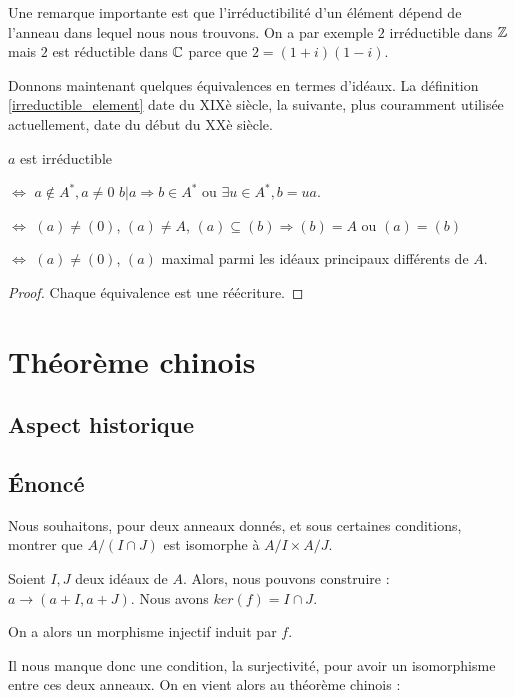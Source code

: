 Une remarque importante est que l'irréductibilité d'un élément dépend de l'anneau
dans lequel nous nous trouvons. On a par exemple $2$ irréductible dans
$\mathbb{Z}$ mais $2$ est réductible dans $\mathbb{C}$ parce que $2 = (1 + i) (1 -
i)$.

Donnons maintenant quelques équivalences en termes d'idéaux. La définition
\ref{irreductible_element} date du XIXè siècle, la suivante, plus couramment
utilisée actuellement, date du début du XXè siècle.

\begin{proposition}

	$a$ est irréductible

	$\Leftrightarrow$
	$a \notin A^{*}, a \ne 0$ $b | a \Rightarrow b \in A^{*}$ ou $\exists u \in
	A^{*}, b = ua$.

	$\Leftrightarrow$
	$(a) \ne (0)$, $(a) \ne A$, $(a) \subseteq (b) \Rightarrow (b) = A$ ou $(a)
	= (b)$

	$\Leftrightarrow$
	$(a) \ne (0)$, $(a)$ maximal parmi les idéaux principaux différents de $A$.
\end{proposition}

\begin{proof}
	Chaque équivalence est une réécriture.
\end{proof}
\section{Théorème chinois}

\subsection{Aspect historique}

\subsection{Énoncé}
Nous souhaitons, pour deux anneaux donnés, et sous certaines conditions, montrer
que $A/(I \cap J)$ est isomorphe à $A/I \times A/J$.

Soient $I, J$ deux idéaux de $A$. Alors, nous pouvons construire
 : $a \rightarrow (a + I, a + J)$.
Nous avons $ker(f) = I \cap J$.

On a alors un morphisme injectif  induit par $f$.

Il nous manque donc une condition, la surjectivité, pour avoir un isomorphisme
entre ces deux anneaux.
On en vient alors au théorème chinois :

